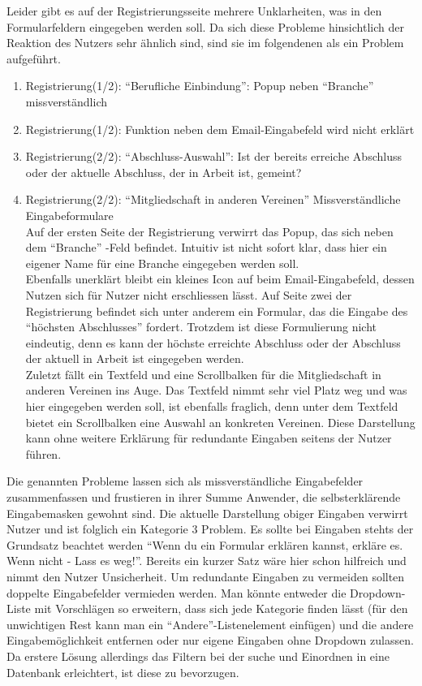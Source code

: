 {
Leider gibt es auf der Registrierungsseite mehrere Unklarheiten, was in den Formularfeldern eingegeben werden soll. Da sich diese Probleme hinsichtlich der Reaktion
des Nutzers sehr ähnlich sind, sind sie im folgendenen als ein Problem aufgeführt.

\begin{enumerate}
	\item {Registrierung(1/2): “Berufliche Einbindung”: Popup neben “Branche” missverständlich}
	\item {Registrierung(1/2): Funktion neben dem Email-Eingabefeld wird nicht erklärt}
	\item {Registrierung(2/2): “Abschluss-Auswahl”: Ist der bereits erreiche Abschluss oder der aktuelle Abschluss, der in Arbeit ist, gemeint? }
	\item {Registrierung(2/2): “Mitgliedschaft in anderen Vereinen” Missverständliche Eingabeformulare}	
\\	
Auf der ersten Seite der Registrierung verwirrt das Popup, das sich neben dem “Branche” -Feld befindet. Intuitiv ist nicht sofort klar, dass hier ein eigener
Name für eine Branche eingegeben werden soll.\\
Ebenfalls unerklärt bleibt ein kleines Icon auf beim Email-Eingabefeld, dessen Nutzen sich für Nutzer nicht erschliessen lässt.
Auf Seite zwei der Registrierung befindet sich unter anderem ein Formular, das die Eingabe des “höchsten Abschlusses” fordert. Trotzdem ist diese Formulierung nicht eindeutig,
denn es kann der höchste erreichte Abschluss oder der Abschluss der aktuell in Arbeit ist eingegeben werden.\\
Zuletzt fällt ein Textfeld und eine Scrollbalken für die Mitgliedschaft in anderen Vereinen ins Auge. Das Textfeld nimmt sehr viel Platz weg und was hier eingegeben werden soll, ist ebenfalls fraglich, denn unter dem Textfeld bietet ein Scrollbalken eine Auswahl an konkreten Vereinen. Diese Darstellung kann ohne weitere Erklärung für redundante Eingaben seitens der Nutzer führen.
	
\end{enumerate}
}
{Die genannten Probleme lassen sich als missverständliche Eingabefelder zusammenfassen und frustieren in ihrer Summe Anwender, die selbsterklärende Eingabemasken gewohnt sind. Die aktuelle Darstellung obiger Eingaben verwirrt Nutzer und ist folglich ein Kategorie 3 Problem.
}{
Es sollte bei Eingaben stehts der Grundsatz beachtet werden “Wenn du ein Formular erklären kannst, erkläre es. Wenn nicht - Lass es weg!”. Bereits ein kurzer Satz wäre hier schon hilfreich und nimmt den Nutzer Unsicherheit. Um redundante Eingaben zu vermeiden sollten doppelte Eingabefelder vermieden werden. Man könnte entweder die Dropdown-Liste mit Vorschlägen so erweitern, dass sich jede Kategorie finden lässt (für den unwichtigen Rest kann man ein “Andere”-Listenelement einfügen) und die andere Eingabemöglichkeit entfernen oder nur eigene Eingaben ohne Dropdown zulassen. Da erstere Lösung allerdings das Filtern bei der suche und Einordnen in eine Datenbank erleichtert, ist diese zu bevorzugen.}
  



